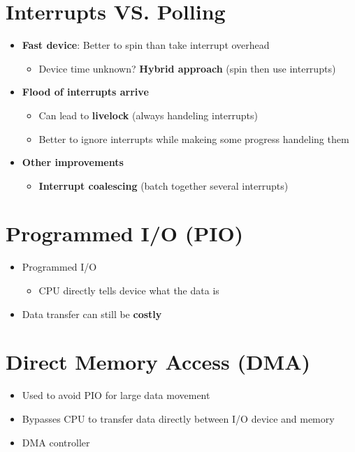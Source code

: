\documentclass[a4paper,11pt,english]{article}
\begin{document}
\section*{Interrupts VS. Polling}
\begin{itemize}
    \item \textbf{\color{blue} Fast device}: Better to spin than take interrupt overhead    
        \begin{itemize}
            \item Device time unknown? \textbf{\color{blue} Hybrid approach} (spin then use interrupts) 
        \end{itemize}
    \item \textbf{\color{red} Flood of interrupts arrive}
        \begin{itemize}
            \item Can lead to \textbf{\color{blue} livelock} (always handeling interrupts)
            \item Better to ignore interrupts while makeing some progress handeling them
        \end{itemize}
    \item \textbf{\color{blue} Other improvements}
        \begin{itemize}
            \item \textbf{\color{blue} Interrupt coalescing} (batch together several interrupts) 
        \end{itemize}
\end{itemize}

\section*{Programmed I/O (PIO)}
\begin{itemize}
    \item Programmed I/O 
        \begin{itemize}
            \item CPU directly tells device what the data is 
        \end{itemize}
    \item Data transfer can still be \textbf{\color{red} costly}
\end{itemize}

\section*{Direct Memory Access (DMA)}
\begin{itemize}
    \item Used to avoid PIO for large data movement 
    \item Bypasses CPU to transfer data directly between I/O device and memory
    \item DMA controller
\end{itemize}
\end{document}

